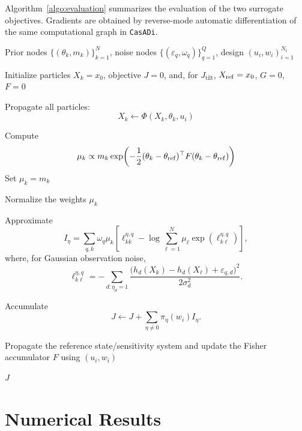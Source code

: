 \documentclass[a4paper,11pt]{article}
\begin{document}
Algorithm~\ref{algo:evaluation} summarizes the evaluation of the two surrogate
objectives. Gradients are obtained by reverse-mode automatic differentiation
of the same computational graph in \texttt{CasADi}.


\begin{algorithm}[htbp]
\caption{Evaluation of $J_{\mathrm{inst}}$ or $J_{\mathrm{tilt}}$}
\label{algo:evaluation}
\begin{algorithmic}[1]

\REQUIRE Prior nodes $\{(\theta_k,m_k)\}_{k=1}^N$, noise nodes
$\{(\varepsilon_q,\omega_q)\}_{q=1}^Q$, design $(u_i,w_i)_{i=1}^{N_t}$

\STATE Initialize particles $X_k=x_0$, objective $J=0$, and, for
$J_{\mathrm{tilt}}$, $X_{\rm ref}=x_0$, $G=0$, $F=0$


\STATE Propagate all particles:
\[
X_k\leftarrow \Phi(X_k,\theta_k,u_i)
\]

\STATE Compute
\[
\mu_k \propto
m_k\exp\!\left(
-\frac12(\theta_k-\theta_{\rm ref})^\top
F(\theta_k-\theta_{\rm ref})
\right)
\]
\ELSE
\STATE Set $\mu_k=m_k$
\ENDIF

\STATE Normalize the weights $\mu_k$


\STATE Approximate
\[
I_\eta
=
\sum_{q,k}\omega_q\mu_k
\left[
\ell_{kk}^{\eta,q}
-
\log\sum_{\ell=1}^N
\mu_\ell\exp(\ell_{k\ell}^{\eta,q})
\right],
\]
where, for Gaussian observation noise,
\[
\ell_{k\ell}^{\eta,q}
=
-\sum_{d:\eta_d=1}
\frac{
\bigl(h_d(X_k)-h_d(X_\ell)+\varepsilon_{q,d}\bigr)^2
}{
2\sigma_d^2
}.
\]

\ENDFOR

\STATE Accumulate
\[
J\leftarrow J+\sum_{\eta\neq0}\pi_\eta(w_i)I_\eta .
\]

\STATE Propagate the reference state/sensitivity system and update
the Fisher accumulator $F$ using $(u_i,w_i)$
\ENDIF

\ENDFOR

\RETURN $J$

\end{algorithmic}
\end{algorithm}

\section{Numerical Results}\label{sec:numerical_results}
\end{document}
